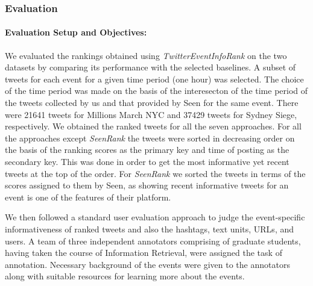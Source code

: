 \subsubsection{Evaluation}

\paragraph{Evaluation Setup and Objectives:}

We evaluated the rankings obtained using \textit{TwitterEventInfoRank} on the two datasets by comparing its performance with the selected baselines. A subset of tweets for each event for a given time period (one hour) was selected. The choice of the time period was made on the basis of the interesecton of the time period of the tweets collected by us and that provided by Seen for the same event. There were 21641 tweets for Millions March NYC and 37429 tweets for Sydney Siege, respectively. We obtained the ranked tweets for all the seven approaches. For all the approaches except \textit{SeenRank} the tweets were sorted in decreasing order on the basis of the ranking scores as the primary key and time of posting as the secondary key. This was done in order to get the most informative yet recent tweets at the top of the order. For \textit{SeenRank} we sorted the tweets in terms of the scores assigned to them by Seen, as showing recent informative tweets for an event is one of the features of their platform.

We then followed a standard user evaluation approach to judge the event-specific informativeness of ranked tweets and also the hashtags, text units, URLs, and users.  A team of three independent annotators comprising of graduate students, having taken the course of Information Retrieval, were assigned the task of annotation. Necessary background of the events were given to the annotators along with suitable resources for learning more about the events.

